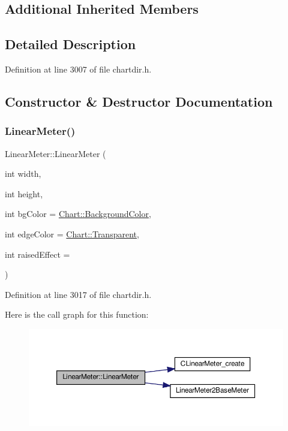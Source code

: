 \subsection*{Additional Inherited Members}


\subsection{Detailed Description}


Definition at line 3007 of file chartdir.\+h.



\subsection{Constructor \& Destructor Documentation}
\mbox{\label{class_linear_meter_a7a87e1ea118e2b8dfddb06b9622a7d80}} 
\subsubsection{\texorpdfstring{Linear\+Meter()}{LinearMeter()}}
{\footnotesize\ttfamily Linear\+Meter\+::\+Linear\+Meter (\begin{DoxyParamCaption}\item[{int}]{width,  }\item[{int}]{height,  }\item[{int}]{bg\+Color = {\ttfamily \hyperlink{namespace_chart_abee0d882fdc9ad0b001245ad9fc64011a134193bde693b9d152d0c6dc59fa7d7f}{Chart\+::\+Background\+Color}},  }\item[{int}]{edge\+Color = {\ttfamily \hyperlink{namespace_chart_abee0d882fdc9ad0b001245ad9fc64011afc6811800a9e2582dac0157b6279f836}{Chart\+::\+Transparent}},  }\item[{int}]{raised\+Effect = {} }\end{DoxyParamCaption})\hspace{0.3cm}{\ttfamily [inline]}}



Definition at line 3017 of file chartdir.\+h.

Here is the call graph for this function\+:
\nopagebreak
\begin{figure}[H]
\begin{center}
\leavevmode
\includegraphics[width=350pt]{class_linear_meter_a7a87e1ea118e2b8dfddb06b9622a7d80_cgraph}
\end{center}
\end{figure}


